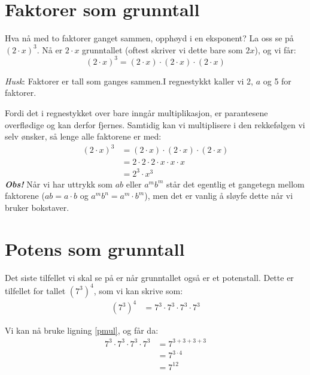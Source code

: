 \section{Faktorer som grunntall}
\parbox[l][][l]{0.6\linewidth}{
Hva nå med to faktorer ganget sammen, opphøyd i en eksponent? La oss
se på ${(2\cdot x)^{3}}$. Nå er ${2\cdot x}$ grunntallet (oftest skriver
vi dette bare som $2x$), og vi får: 
\[
(2\cdot x)^{3}=(2\cdot x)\cdot(2\cdot x)\cdot(2\cdot x)
\] }\qquad
\parbox[r][][l]{0.3\linewidth}{\begin{shaded}%
		\textsl{Husk}: Faktorer er tall som ganges sammen.I regnestykkt  kaller vi 2, $ a $ og 5 for faktorer.\end{shaded}}
Fordi det i regnestykket over bare inngår multiplikasjon, er parantesene overflødige og kan derfor fjernes. Samtidig kan vi multiplisere i den rekkefølgen vi selv ønsker, så lenge alle faktorene er med:
\begin{align*}
(2\cdot x)^{3} & =(2\cdot x)\cdot(2\cdot x)\cdot(2\cdot x)\\
 & =2\cdot2\cdot2\cdot x\cdot x\cdot x\\
 & =2^{3}\cdot x^{3}
\end{align*}
\regv
\textbf{\textsl{Obs!}} Når vi har uttrykk som $ab$ eller $a^{m}b^{m}$ står det egentlig et gangetegn mellom faktorene (${ab=a\cdot b}$ og ${a^{m}b^{n}=a^{m}\cdot b^{m}}$),
men det er vanlig å sløyfe dette når vi bruker bokstaver.\regv

\eks[1]{\vs\vs
\[
(ab)^{4}=a^{4}b^{4}
\]}


\section{Potens som grunntall}
Det siste tilfellet vi skal se på er når grunntallet også er
et potenstall. Dette er tilfellet for tallet $\left(7^{3}\right)^{4}$, som vi kan skrive som:
\begin{align*}
\left(7^{3}\right)^{4} & =7^{3}\cdot7^{3}\cdot7^{3}\cdot7^{3}
\end{align*}


Vi kan nå bruke ligning \eqref{pmul}, og får da: 
\begin{align*}
7^{3}\cdot7^{3}\cdot7^{3}\cdot7^{3} & =7^{3+3+3+3}\\
 & =7^{3\cdot4}\\
 & =7^{12}
\end{align*}

